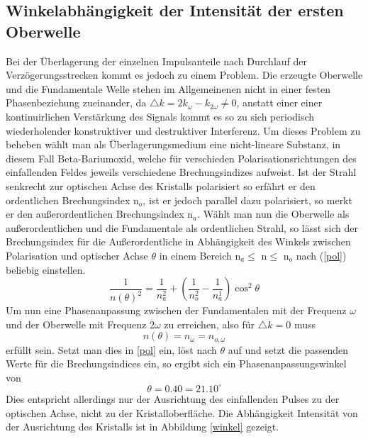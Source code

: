 \subsection{Winkelabhängigkeit der Intensität der ersten Oberwelle}
Bei der Überlagerung der einzelnen Impulsanteile nach Durchlauf der Verzögerungsstrecken kommt es jedoch zu einem Problem. Die erzeugte Oberwelle und die Fundamentale Welle stehen im Allgemeinenen nicht in einer festen Phasenbeziehung zueinander, da $\triangle k=2k_\omega-k_{2\omega}\neq0$, anstatt einer einer kontinuirlichen Verstärkung des Signals kommt es so zu sich periodisch wiederholender konstruktiver und destruktiver Interferenz. Um dieses Problem zu beheben wählt man als Überlagerungsmedium eine nicht-lineare Substanz, in diesem Fall Beta-Bariumoxid, welche für verschieden Polarisationsrichtungen des einfallenden Feldes jeweils verschiedene Brechungsindizes aufweist. \newline
Ist der Strahl senkrecht zur optischen Achse des Kristalls polarisiert so erfährt er den ordentlichen Brechungsindex n$_o$, ist er jedoch parallel dazu polarisiert, so merkt er den außerordentlichen Brechungsindex n$_a$. \newline
Wählt man nun die Oberwelle als außerordentlichen und die Fundamentale als ordentlichen Strahl, so lässt sich der Brechungsindex für die Außerordentliche in Abhängigkeit des Winkels zwischen Polarisation und optischer Achse $\theta$ in einem Bereich n$_a\leq$ n$\leq$ n$_o$ nach (\ref{pol}) beliebig einstellen.
\begin{equation}
\frac{1}{n(\theta)^2}=\frac{1}{n_a^2}+\left(\frac{1}{n_o^2}-\frac{1}{n_a^1}\right)\cos^2\theta
\label{pol}
\end{equation}
Um nun eine Phasenanpassung zwischen der Fundamentalen mit der Frequenz $\omega$ und der Oberwelle mit Frequenz 2$\omega$ zu erreichen, also für $\triangle k=0$ muss
\begin{equation}
n(\theta)=n_\omega=n_{o,\omega}
\end{equation}
erfüllt sein. Setzt man dies in \ref{pol} ein, löst nach $\theta$ auf und setzt die passenden Werte für die Brechungsindices ein, so ergibt sich ein Phasenanpassungswinkel von
\begin{equation}
\theta=0.40=21.10^\circ
\end{equation}
Dies entspricht allerdings nur der Ausrichtung des einfallenden Pulses zu der optischen Achse, nicht zu der Kristalloberfläche. Die Abhängigkeit Intensität von der Ausrichtung des Kristalls ist in Abbildung \ref{winkel} gezeigt.
